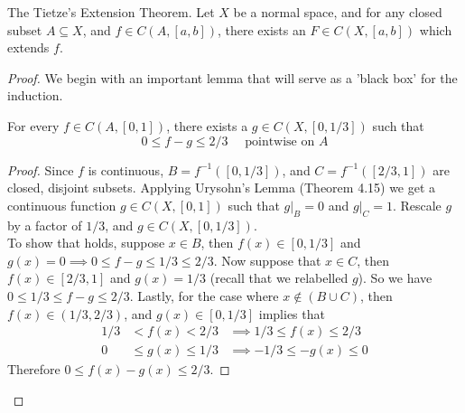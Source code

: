 \documentclass[../../main.tex]{subfiles}
\begin{document}
\begin{wts}
The Tietze's Extension Theorem. Let $X$ be a normal space, and for any closed subset $A\subseteq X$, and $f\in C(A,[a,b])$, there exists an $F\in C(X,[a,b])$ which extends $f$.
\end{wts}
\begin{proof}
We begin with an important lemma that will serve as a 'black box' for the induction.
\begin{lemma}\label{lemma:1}
For every $f\in C(A,[0,1])$, there exists a $g\in C(X, [0, 1/3])$ such that 
\begin{equation}\label{eq:1}
0\leq f-g\leq 2/3 \quad\textrm{ pointwise on } A    
\end{equation}
\end{lemma}
\begin{proof}
Since $f$ is continuous, $B=f^{-1}([0,1/3])$, and $C=f^{-1}([2/3,1])$ are closed, disjoint subsets. Applying Urysohn's Lemma (Theorem 4.15) we get a continuous function $g\in C(X,[0,1])$ such that $g|_B = 0$ and $g|_C = 1$. Rescale $g$ by a factor of $1/3$, and $g\in C(X,[0,1/3])$.\\

To show that  holds, suppose $x\in B$, then $f(x)\in[0,1/3]$ and $g(x)=0\implies 0\leq f-g\leq 1/3\leq 2/3$. Now suppose that $x\in C$, then $f(x)\in[2/3,1]$ and $g(x)=1/3$ (recall that we relabelled $g$). So we have $0\leq 1/3\leq f-g\leq 2/3$. Lastly, for the case where $x\notin (B\cup C)$, then $f(x)\in (1/3, 2/3)$, and $g(x)\in[0, 1/3]$ implies that 
\begin{align*}
    1/3 &<    f(x) <    2/3 &\implies 1/3 \leq   f(x) \leq 2/3\\
    0   &\leq g(x) \leq 1/3 &\implies -1/3 \leq -g(x) \leq 0    
\end{align*}
Therefore $0\leq f(x)-g(x)\leq 2/3$.
\end{proof}


\end{proof}
\end{document}
